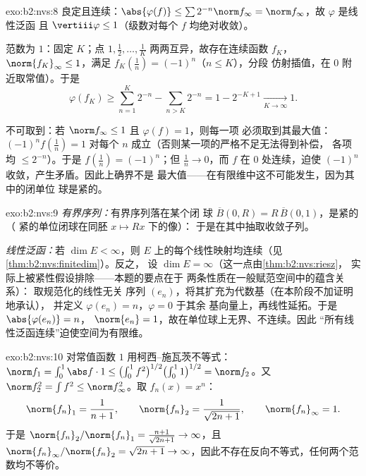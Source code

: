 \begin{solution}{exo:b2:nvs:8}
良定且连续：$\abs{\varphi(f)} \leq \sum 2^{-n}
\norm f_\infty = \norm f_\infty$，故 $\varphi$ 是线性泛函
且 $\vertiii\varphi \leq 1$（级数对每个
$f$ 均绝对收敛）。

范数为 $1$：固定 $K$；点 $1, \frac12, \dots, \frac1K$
两两互异，故存在连续函数 $f_K$，$\norm{f_K}_\infty
\leq 1$，满足 $f_K(\frac1n) = (-1)^n$（$n \leq K$），分段
仿射插值，在 $0$ 附近取常值）。于是
\[
\varphi(f_K) \geq \sum_{n=1}^{K} 2^{-n} - \sum_{n > K} 2^{-n}
= 1 - 2^{-K+1} \xrightarrow[K \to \infty]{} 1 .
\]

不可取到：若 $\norm f_\infty \leq 1$ 且 $\varphi(f) = 1$，则每一项
必须取到其最大值：$(-1)^n f(\frac1n) = 1$ 对每个
$n$ 成立（否则某一项的严格不足无法得到补偿，
各项均 $\leq 2^{-n}$）。于是 $f(\frac1n) = (-1)^n$；但
$\frac1n \to 0$，而 $f$ 在 $0$ 处连续，迫使
$(-1)^n$ 收敛，产生矛盾。因此上确界不是
最大值——在有限维中这不可能发生，因为其中的闭单位
球是紧的。
\end{solution}

\begin{solution}{exo:b2:nvs:9}
\emph{有界序列：}有界序列落在某个闭
球 $\overline B(0, R) = R\,\overline B(0,1)$，是紧的（
紧的单位闭球在同胚 $x \mapsto Rx$ 下的像）：
于是在其中抽取收敛子列。

\emph{线性泛函：}若 $\dim E < \infty$，则
$E$ 上的每个线性映射均连续（见\cref{thm:b2:nvs:finitedim}）。反之，
设 $\dim E = \infty$（这一点由\cref{thm:b2:nvs:riesz}，
实际上被紧性假设排除——本题的要点在于
两条性质在一般赋范空间中的蕴含关系）：
取规范化的线性无关
序列 $(e_n)$，将其扩充为代数基（在本阶段不加证明地承认），
并定义 $\varphi(e_n) = n$，$\varphi = 0$ 于其余
基向量上，再线性延拓。于是 $\abs{\varphi(e_n)} = n$，
$\norm{e_n} = 1$，故在单位球上无界、不连续。因此
“所有线性泛函连续”迫使空间为有限维。
\end{solution}

\begin{solution}{exo:b2:nvs:10}
对常值函数 $1$ 用柯西–施瓦茨不等式：$\norm f_1 =
\int_0^1 \abs f\cdot 1 \leq \bigl(\int_0^1
f^2\bigr)^{1/2}\bigl(\int_0^1 1\bigr)^{1/2} = \norm f_2$。又
$\norm f_2^2 = \int f^2 \leq \norm f_\infty^2$。取 $f_n(x) =
x^n$：
\[
\norm{f_n}_1 = \frac1{n+1}, \qquad
\norm{f_n}_2 = \frac1{\sqrt{2n+1}}, \qquad
\norm{f_n}_\infty = 1 .
\]
于是 $\norm{f_n}_2/\norm{f_n}_1 = \frac{n+1}{\sqrt{2n+1}} \to
\infty$，且 $\norm{f_n}_\infty/\norm{f_n}_2 = \sqrt{2n+1} \to
\infty$，因此不存在反向不等式，任何两个范数均不等价。
\end{solution}


